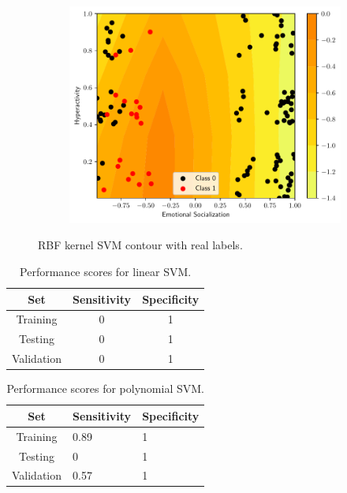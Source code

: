 \documentclass[conference]{IEEEtran}
\theoremstyle{definition}
\theoremstyle{remark}
\theoremstyle{remark}
\begin{document}
\begin{figure}
\begin{subfigure}[b]{0.32\textwidth}
        \includegraphics[width=\textwidth]{figs/svm-rbf-contour-2-5.pdf}
        \caption{}
    \end{subfigure}
    \caption{RBF kernel SVM contour with real labels.}
    \label{fig:SVM-rbf}
\end{figure}

\begin{table}
\centering
\caption{Performance scores for linear SVM.}
\label{tab:linear_SVM}
\begin{tabular}{ccc}
\hline
\textbf{Set} & \textbf{Sensitivity} & \textbf{Specificity} \\ \hline
Training & 0 & 1 \\
Testing & 0 & 1 \\
Validation & 0 & 1 \\ \hline
\end{tabular}
\end{table}

\begin{table}
\centering
\caption{Performance scores for polynomial SVM.}
\label{tab:poly_SVM}
\begin{tabular}{cll}
\hline
\textbf{Set} & \multicolumn{1}{c}{\textbf{Sensitivity}} & \multicolumn{1}{c}{\textbf{Specificity}} \\ \hline
Training & 0.89 & 1 \\
Testing & 0 & 1 \\
Validation & 0.57 & 1 \\ \hline
\end{tabular}
\end{table}
\end{document}
